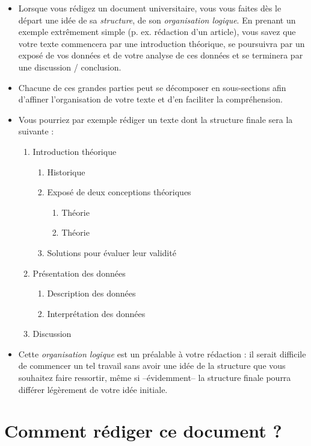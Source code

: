\begin{itemize}
\item Lorsque vous rédigez un document universitaire, vous vous faites
  dès le départ une idée de sa \emph{structure}, de son
  \emph{organisation logique}. En prenant un exemple extrêmement
  simple (p. ex. rédaction d'un article), vous savez que votre texte
  commencera par une introduction théorique, se poursuivra par un
  exposé de vos données et de votre analyse de ces données et se
  terminera par une discussion / conclusion.
\item Chacune de ces grandes parties peut se décomposer en
  sous-sections afin d'affiner l'organisation de votre texte et d'en
  faciliter la compréhension.
\item Vous pourriez par exemple rédiger un texte dont la structure
  finale sera la suivante :
\label{struct-logique}
  \begin{enumerate}
  \item Introduction théorique
    \begin{enumerate}
    \item Historique
    \item Exposé de deux conceptions théoriques
      \begin{enumerate}
      \item Théorie 
      \item Théorie 
      \end{enumerate}
    \item Solutions pour évaluer leur validité
    \end{enumerate}
\item Présentation des données
  \begin{enumerate}
  \item Description des données
  \item Interprétation des données
  \end{enumerate}
  \item Discussion
  \end{enumerate}
\item Cette \emph{organisation logique} est un préalable à votre
  rédaction : il serait difficile de commencer un tel travail sans
  avoir une idée de la structure que vous souhaitez faire ressortir,
  même si --évidemment-- la structure finale pourra différer
  légèrement de votre idée initiale.
\end{itemize}

\section{Comment rédiger ce document ?}

